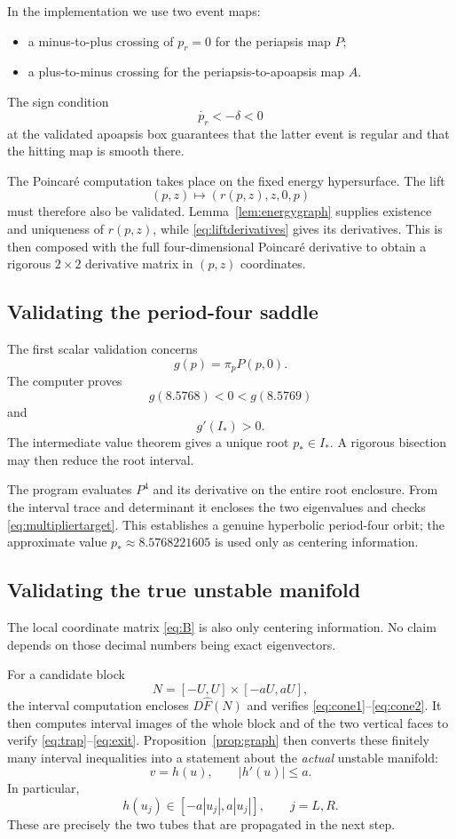 \documentclass[11pt]{article}
\newcommand{\pr}{p_r}
\begin{document}
In the implementation we use two event maps:
\begin{itemize}
\item a minus-to-plus crossing of $\pr=0$ for the periapsis map $P$;
\item a plus-to-minus crossing for the periapsis-to-apoapsis map $A$.
\end{itemize}
The sign condition
\[
 \dot{\pr}<-\delta<0
\]
at the validated apoapsis box guarantees that the latter event is regular and
that the hitting map is smooth there.

The Poincar\'e computation takes place on the fixed energy hypersurface.
The lift
\[
 (p,z)\longmapsto(r(p,z),z,0,p)
\]
must therefore also be validated.  Lemma~\ref{lem:energygraph} supplies
existence and uniqueness of $r(p,z)$, while
\eqref{eq:liftderivatives} gives its derivatives.  This is then composed with
the full four-dimensional Poincar\'e derivative to obtain a rigorous
$2\times2$ derivative matrix in $(p,z)$ coordinates.

\subsection{Validating the period-four saddle}

The first scalar validation concerns
\[
 g(p)=\pi_pP(p,0).
\]
The computer proves
\[
 g(8.5768)<0<g(8.5769)
\]
and
\[
 g'(I_*)>0.
\]
The intermediate value theorem gives a unique root $p_*\in I_*$.
A rigorous bisection may then reduce the root interval.

The program evaluates $P^4$ and its derivative on the entire root enclosure.
From the interval trace and determinant it encloses the two eigenvalues and
checks \eqref{eq:multipliertarget}.  This establishes a genuine hyperbolic
period-four orbit; the approximate value $p_*\approx8.5768221605$ is used
only as centering information.

\subsection{Validating the true unstable manifold}

The local coordinate matrix \eqref{eq:B} is also only centering information.
No claim depends on those decimal numbers being exact eigenvectors.

For a candidate block
\[
 N=[-U,U]\times[-aU,aU],
\]
the interval computation encloses $D\widehat F(N)$ and verifies
\eqref{eq:cone1}--\eqref{eq:cone2}.  It then computes interval images of the
whole block and of the two vertical faces to verify
\eqref{eq:trap}--\eqref{eq:exit}.  Proposition~\ref{prop:graph} then converts
these finitely many interval inequalities into a statement about the
\emph{actual} unstable manifold:
\[
 v=h(u),\qquad |h'(u)|\le a.
\]
In particular,
\[
 h(u_j)\in[-a|u_j|,a|u_j|],
 \qquad j=L,R.
\]
These are precisely the two tubes that are propagated in the next step.
\end{document}
